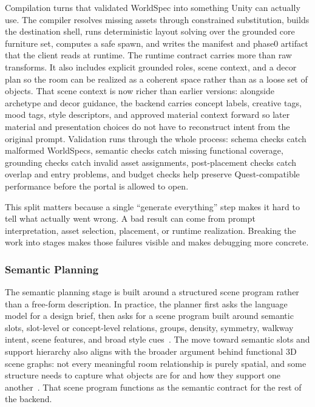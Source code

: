 \documentclass[12pt]{article}
\begin{document}
Compilation turns that validated WorldSpec into something Unity can actually use. The compiler resolves missing assets through constrained substitution, builds the destination shell, runs deterministic layout solving over the grounded core furniture set, computes a safe spawn, and writes the manifest and phase0 artifact that the client reads at runtime. The runtime contract carries more than raw transforms. It also includes explicit grounded roles, scene context, and a decor plan so the room can be realized as a coherent space rather than as a loose set of objects. That scene context is now richer than earlier versions: alongside archetype and decor guidance, the backend carries concept labels, creative tags, mood tags, style descriptors, and approved material context forward so later material and presentation choices do not have to reconstruct intent from the original prompt. Validation runs through the whole process: schema checks catch malformed WorldSpecs, semantic checks catch missing functional coverage, grounding checks catch invalid asset assignments, post-placement checks catch overlap and entry problems, and budget checks help preserve Quest-compatible performance before the portal is allowed to open.

This split matters because a single ``generate everything'' step makes it hard to tell what actually went wrong. A bad result can come from prompt interpretation, asset selection, placement, or runtime realization. Breaking the work into stages makes those failures visible and makes debugging more concrete.

\subsubsection{Semantic Planning}
The semantic planning stage is built around a structured scene program rather than a free-form description. In practice, the planner first asks the language model for a design brief, then asks for a scene program built around semantic slots, slot-level or concept-level relations, groups, density, symmetry, walkway intent, scene features, and broad style cues~\cite{Feng_2023_NeurIPS_LayoutGPT, Gao_2024_CVPR_GraphDreamer, Zhai_2023_NeurIPS_CommonScenes}. The move toward semantic slots and support hierarchy also aligns with the broader argument behind functional 3D scene graphs: not every meaningful room relationship is purely spatial, and some structure needs to capture what objects are for and how they support one another~\cite{Zhang_2025_CVPR_OpenFunGraph}. That scene program functions as the semantic contract for the rest of the backend.
\end{document}
